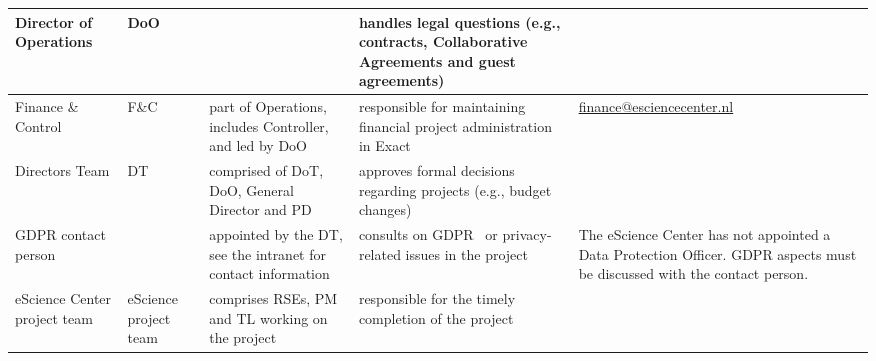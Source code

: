 \documentclass[11pt]{article}
\begin{document}
\begin{tabularx}{\linewidth}{p{}|p{}|p{}|p{}|p{}}
Director of Operations                             & DoO                   &                                                                                                                   & handles legal questions (e.g., contracts, Collaborative Agreements and guest agreements)                                                                                               &                                                                                                                                      \\\hline
Finance \& Control                                 & F\&C                  & part of Operations, includes Controller, and led by DoO                                                           & responsible for maintaining financial project administration in Exact                                                                                                                                                                  & \href{mailto:finance@esciencecenter.nl}{finance@esciencecenter.nl}                                                                                            \\\hline
Directors Team                                     & DT                    & comprised of DoT, DoO, General Director and PD                                                                    & approves formal decisions regarding projects (e.g., budget changes)                                                                                                                                                                    &                                                                                                                                      \\\hline
GDPR contact person                                &                       & appointed by the DT, see the intranet for contact information                                                     & consults on GDPR~\cite{GDPR} or privacy-related issues in the project                                                                                                                                                                             & The eScience Center has not appointed a Data Protection Officer. GDPR aspects must be discussed with the contact person.             \\\hline
eScience Center project team                       & eScience project team & comprises RSEs, PM and TL working on the project                                                                  & responsible for the timely completion of the project                                                                                                                                                                                   &                                                                                                                                      \\\hline

\end{tabularx}
\end{document}
